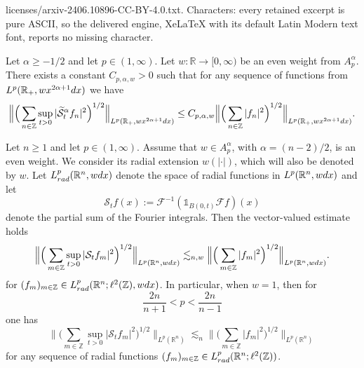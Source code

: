 \documentclass[10pt,a4paper]{amsart}
\newcommand{\RR}{\mathbb{R}}
\newcommand{\ZZ}{\mathbb{Z}}
\newcommand{\calF}{\mathcal{F}}
\newcommand{\calS}{\mathcal{S}}
\begin{document}
licenses/arxiv-2406.10896-CC-BY-4.0.txt. Characters: every retained excerpt is pure ASCII, so the delivered engine, XeLaTeX with its default Latin Modern text font, reports no missing character.
\begin{corollary}\label{cor:hankelsum}
Let $\alpha\geq-1/2$ and let $p\in(1,\infty)$. Let $w\colon\RR\to[0,\infty)$ be an even weight from $A_p^\alpha$. There exists a constant $C_{p,\alpha,w}>0$ such that for any sequence of functions from $L^p(\RR_+,wx^{2\alpha+1}{\rm d}x)$ we have 
\begin{equation*}
    \Big\|\Big(\sum_{n\in\ZZ}\sup_{t>0} |\widetilde{\calS}_{t}^\alpha f_n|^2\Big)^{1/2}\Big\|_{L^p(\RR_+,wx^{2\alpha+1}{\rm d}x)}\leq C_{p,\alpha,w}\Big\|\Big(\sum_{n\in\ZZ}|f_n|^2\Big)^{1/2}\Big\|_{L^p(\RR_+,wx^{2\alpha+1}{\rm d}x)}.
\end{equation*}
\end{corollary}

\begin{theorem}\label{thm:carlesonvectorradial}
Let \( n \geq 1 \) and let \( p \in (1, \infty) \). Assume that \( w \in A_p^\alpha \), with \( \alpha = (n - 2)/2 \), is an even weight. We consider its radial extension \( w(|\cdot|) \), which will also be denoted by \( w \). Let $L_{\rm rad}^p(\RR^n,w{\rm d}x)$ denote the space of radial functions in $L^p(\RR^n,w{\rm d}x)$ and let
\begin{equation*}
    \calS_t f(x):=\calF^{-1}(\mathds{1}_{B(0,t)}\calF f)(x)
\end{equation*}
denote the partial sum of the Fourier integrals. Then the vector-valued estimate holds
\begin{equation}\label{eq:hankelsumtoprove}
    \Big\|\Big(\sum_{m\in\ZZ}\sup_{t>0} |\calS_t f_m|^2\Big)^{1/2}\Big\|_{L^p(\RR^n,w{\rm d}x)}\lesssim_{n,w}\Big\|\Big(\sum_{m\in\ZZ}|f_m|^2\Big)^{1/2}\Big\|_{L^p(\RR^n,w{\rm d}x)}.
\end{equation}
for $(f_m)_{m\in\ZZ}\in L_{\rm rad}^p(\RR^n;\ell^2(\ZZ),w{\rm d}x)$. In particular, when $w=1$, then for
\begin{equation*}
    \frac{2n}{n+1}<p<\frac{2n}{n-1}
\end{equation*}
one has
\begin{equation*}
    \Big\|\Big(\sum_{m\in\ZZ}\sup_{t>0} |\calS_t f_m|^2\Big)^{1/2}\Big\|_{L^p(\RR^n)}\lesssim_{n}\Big\|\Big(\sum_{m\in\ZZ}|f_m|^2\Big)^{1/2}\Big\|_{L^p(\RR^n)}
\end{equation*}
for any sequence of radial functions $(f_m)_{m\in\ZZ}\in L_{\rm rad}^p(\RR^n;\ell^2(\ZZ))$.
\end{theorem}
\end{document}
